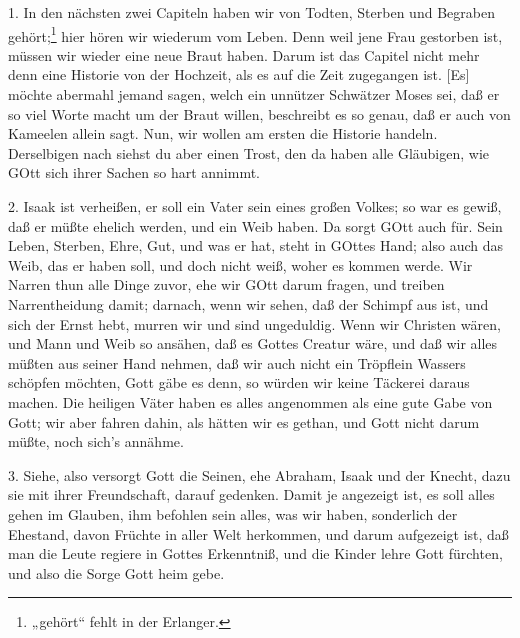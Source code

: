 1. In den nächsten zwei Capiteln haben wir von Todten, Sterben und Begraben gehört;\footnote{„gehört“ fehlt in der Erlanger.} hier hören wir wiederum vom Leben. Denn weil jene Frau gestorben ist, müssen wir wieder eine neue Braut haben. Darum ist das Capitel nicht mehr denn eine Historie von der Hochzeit, als es auf die Zeit zugegangen ist. [Es] möchte abermahl jemand sagen, welch ein unnützer Schwätzer Moses sei, daß er so viel Worte macht um der Braut willen, beschreibt es so genau, daß er auch von Kameelen allein sagt. Nun, wir wollen am ersten die Historie handeln. Derselbigen nach siehst du aber einen Trost, den da haben alle Gläubigen, wie GOtt sich ihrer Sachen so hart annimmt.

2. Isaak ist verheißen, er soll ein Vater sein eines großen Volkes; so war es gewiß, daß er müßte ehelich werden, und ein Weib haben. Da sorgt GOtt auch für. Sein Leben, Sterben, Ehre, Gut, und was er hat, steht in GOttes Hand; also auch das Weib, das er haben soll, und doch nicht weiß, woher es kommen werde. Wir Narren thun alle Dinge zuvor, ehe wir GOtt darum fragen, und treiben Narrentheidung damit; darnach, wenn wir sehen, daß der Schimpf aus ist, und sich der Ernst hebt, murren wir und sind ungeduldig. Wenn wir Christen wären, und Mann und Weib so ansähen, daß
es Gottes Creatur wäre, und daß wir alles müßten aus seiner Hand nehmen, daß wir auch nicht ein Tröpflein Wassers schöpfen möchten, Gott gäbe es denn, so würden wir keine Täckerei daraus machen. Die heiligen Väter haben es alles angenommen als eine gute Gabe von Gott; wir aber fahren dahin, als hätten wir es gethan, und Gott nicht darum müßte, noch sich’s annähme.

3. Siehe, also versorgt Gott die Seinen, ehe Abraham, Isaak und der Knecht, dazu sie mit ihrer Freundschaft, darauf gedenken. Damit je angezeigt ist, es soll alles gehen im Glauben, ihm befohlen sein alles, was wir haben, sonderlich der Ehestand, davon Früchte in aller Welt herkommen, und darum aufgezeigt ist, daß man die Leute regiere in Gottes Erkenntniß, und die Kinder lehre Gott fürchten, und also die Sorge Gott heim gebe.

